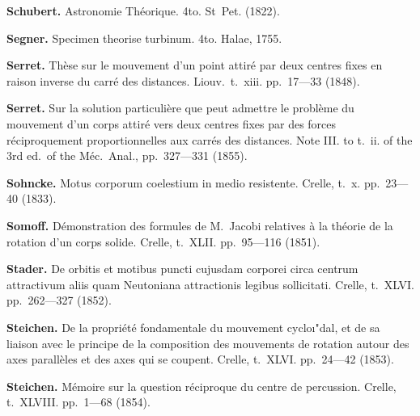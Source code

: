 \documentclass[11pt,a4paper]{book}
\begin{document}
\vspace{0.5em}

\noindent\textbf{Schubert.} Astronomie Th\'{e}orique. 4to. St~Pet. (1822).

\vspace{0.5em}

\noindent\textbf{Segner.} Specimen theorise turbinum. 4to. Halae, 1755.

\vspace{0.5em}

\noindent\textbf{Serret.} Th\`{e}se sur le mouvement d'un point attir\'{e} par deux centres fixes en raison inverse du carr\'{e} des distances. Liouv.~t.~xiii. pp.~17---33 (1848).

\vspace{0.5em}

\noindent\textbf{Serret.} Sur la solution particuli\`{e}re que peut admettre le probl\`{e}me du mouvement d'un corps attir\'{e} vers deux centres fixes par des forces r\'{e}ciproquement proportionnelles aux carr\'{e}s des distances. Note III. to t.~ii. of the 3rd ed.~of the M\'{e}c.~Anal., pp.~327---331 (1855).

\vspace{0.5em}

\noindent\textbf{Sohncke.} Motus corporum coelestium in medio resistente. Crelle, t.~x. pp.~23---40 (1833).

\vspace{0.5em}

\noindent\textbf{Somoff.} D\'{e}monstration des formules de M.~Jacobi relatives \`{a} la th\'{e}orie de la rotation d'un corps solide. Crelle, t.~XLII. pp.~95---116 (1851).

\vspace{0.5em}

\noindent\textbf{Stader.} De orbitis et motibus puncti cujusdam corporei circa centrum attractivum aliis quam Neutoniana attractionis legibus sollicitati. Crelle, t.~XLVI. pp.~262---327 (1852).

\vspace{0.5em}

\noindent\textbf{Steichen.} De la propri\'{e}t\'{e} fondamentale du mouvement cyclo\i"{d}al, et de sa liaison avec le principe de la composition des mouvements de rotation autour des axes parall\`{e}les et des axes qui se coupent. Crelle, t.~XLVI. pp.~24---42 (1853).

\vspace{0.5em}

\noindent\textbf{Steichen.} M\'{e}moire sur la question r\'{e}ciproque du centre de percussion. Crelle, t.~XLVIII. pp.~1---68 (1854).
\end{document}
